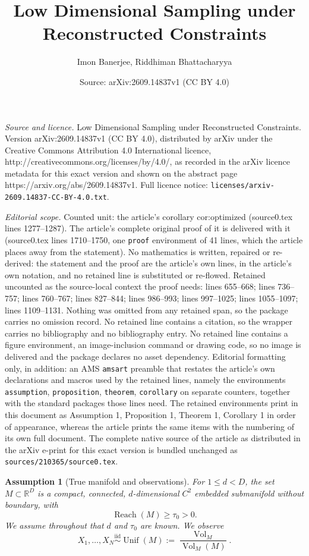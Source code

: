 \documentclass[10pt,a4paper]{amsart}
\title{Low Dimensional Sampling under Reconstructed Constraints}
\author{Imon Banerjee, Riddhiman Bhattacharyya}
\date{Source: arXiv:2609.14837v1 (CC BY 4.0)}
\newtheorem{assumption}{Assumption}
\newcommand{\R}{\mathbb R}
\newcommand{\Reach}{\operatorname{Reach}}
\newcommand{\Vol}{\operatorname{Vol}}
\begin{document}
\maketitle

\noindent\emph{Source and licence.} Low Dimensional Sampling under Reconstructed Constraints. Version arXiv:2609.14837v1 (CC BY 4.0), distributed by arXiv under the Creative Commons Attribution 4.0 International licence, http://creativecommons.org/licenses/by/4.0/, as recorded in the arXiv licence metadata for this exact version and shown on the abstract page https://arxiv.org/abs/2609.14837v1. Full licence notice: \texttt{licenses/arxiv-2609.14837-CC-BY-4.0.txt}.\par\smallskip

\noindent\textit{Editorial scope.} Counted unit: the article's corollary cor:optimized (source0.tex lines 1277--1287). The article's complete original proof of it is delivered with it (source0.tex lines 1710--1750, one \texttt{proof} environment of 41 lines, which the article places away from the statement). No mathematics is written, repaired or re-derived: the statement and the proof are the article's own lines, in the article's own notation, and no retained line is substituted or re-flowed.  Retained uncounted as the source-local context the proof needs: lines 655--668; lines 736--757; lines 760--767; lines 827--844; lines 986--993; lines 997--1025; lines 1055--1097; lines 1109--1131.  Nothing was omitted from any retained span, so the package carries no omission record.  No retained line contains a citation, so the wrapper carries no bibliography and no bibliography entry.  No retained line contains a figure environment, an image-inclusion command or drawing code, so no image is delivered and the package declares no asset dependency.  Editorial formatting only, in addition: an AMS \texttt{amsart} preamble that restates the article's own declarations and macros used by the retained lines, namely the environments \texttt{assumption}, \texttt{proposition}, \texttt{theorem}, \texttt{corollary} on separate counters, together with the standard packages those lines need.  The retained environments print in this document as Assumption 1, Proposition 1, Theorem 1, Corollary 1 in order of appearance, whereas the article prints the same items with the numbering of its own full document.  The complete native source of the article as distributed in the arXiv e-print for this exact version is bundled unchanged as \texttt{sources/210365/source0.tex}.
\begin{assumption}[True manifold and observations]
\label{ass:true-manifold}
For $1\le d<D$, the set $M\subset\R^D$ is a compact, connected,
$d$-dimensional $C^2$ embedded submanifold without boundary, with
\[
  \Reach(M)\ge\tau_0>0.
\]
We assume throughout that $d$ and $\tau_0$ are known. We observe
\[
  X_1,\ldots,X_N\overset{\mathrm{iid}}{\sim}
  \operatorname{Unif}(M)
  :=\frac{\Vol_M}{\Vol_M(M)}.
\]
\end{assumption}
\end{document}
